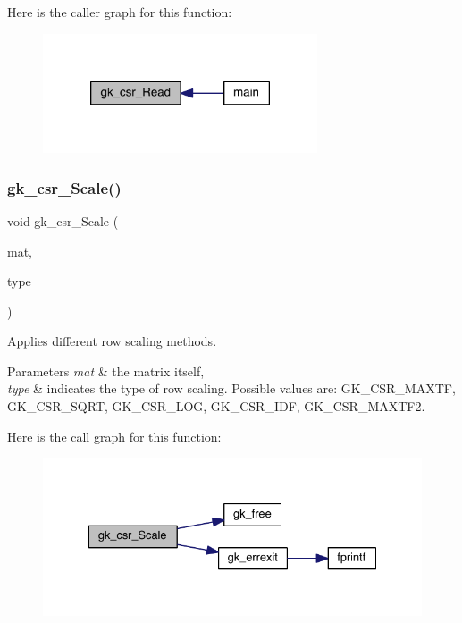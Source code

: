 Here is the caller graph for this function\+:\nopagebreak
\begin{figure}[H]
\begin{center}
\leavevmode
\includegraphics[width=230pt]{a00023_a8ebc19fe9a291bdf67677ebdaae56592_icgraph}
\end{center}
\end{figure}
\mbox{\label{a00023_adf45acdb60028f87304c1edc75baf194}} 
\subsubsection{\texorpdfstring{gk\+\_\+csr\+\_\+\+Scale()}{gk\_csr\_Scale()}}
{\footnotesize\ttfamily void gk\+\_\+csr\+\_\+\+Scale (\begin{DoxyParamCaption}\item[{\hyperlink{a00634}{gk\+\_\+csr\+\_\+t} $\ast$}]{mat,  }\item[{int}]{type }\end{DoxyParamCaption})}

Applies different row scaling methods. 
\begin{DoxyParams}{Parameters}
{\em mat} & the matrix itself, \\
\hline
{\em type} & indicates the type of row scaling. Possible values are\+: G\+K\+\_\+\+C\+S\+R\+\_\+\+M\+A\+X\+TF, G\+K\+\_\+\+C\+S\+R\+\_\+\+S\+Q\+RT, G\+K\+\_\+\+C\+S\+R\+\_\+\+L\+OG, G\+K\+\_\+\+C\+S\+R\+\_\+\+I\+DF, G\+K\+\_\+\+C\+S\+R\+\_\+\+M\+A\+X\+T\+F2. \\
\hline
\end{DoxyParams}
Here is the call graph for this function\+:\nopagebreak
\begin{figure}[H]
\begin{center}
\leavevmode
\includegraphics[width=332pt]{a00023_adf45acdb60028f87304c1edc75baf194_cgraph}
\end{center}
\end{figure}
\mbox{\label{a00023_a06ffa04d1369de42ae3b7d2a9f85b91d}} 
